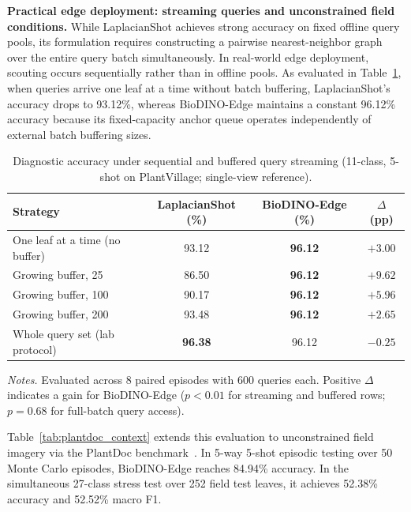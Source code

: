 \textbf{Practical edge deployment: streaming queries and unconstrained field conditions.} While LaplacianShot achieves strong accuracy on fixed offline query pools, its formulation requires constructing a pairwise nearest-neighbor graph over the entire query batch simultaneously. In real-world edge deployment, scouting occurs sequentially rather than in offline pools. As evaluated in Table~\ref{tab:batchsize}, when queries arrive one leaf at a time without batch buffering, LaplacianShot's accuracy drops to 93.12\%, whereas BioDINO-Edge maintains a constant 96.12\% accuracy because its fixed-capacity anchor queue operates independently of external batch buffering sizes.

\begin{table}[htbp]
\caption{Diagnostic accuracy under sequential and buffered query streaming (11-class, 5-shot on PlantVillage; single-view reference).}
\label{tab:batchsize}
\centering

\footnotesize
\setlength{\tabcolsep}{4pt}
\begin{tabular*}{\columnwidth}{@{\extracolsep{\fill}}lccc}
\toprule
\textbf{Strategy} & \textbf{LaplacianShot (\%)} & \textbf{BioDINO-Edge (\%)} & \textbf{$\Delta$ (pp)} \\
\midrule
One leaf at a time (no buffer) & 93.12 & \textbf{96.12} & $+3.00$ \\
Growing buffer, 25 & 86.50 & \textbf{96.12} & $+9.62$ \\
Growing buffer, 100 & 90.17 & \textbf{96.12} & $+5.96$ \\
Growing buffer, 200 & 93.48 & \textbf{96.12} & $+2.65$ \\
Whole query set (lab protocol) & \textbf{96.38} & 96.12 & $-0.25$ \\
\bottomrule
\end{tabular*}

\vspace{3pt}
\begin{minipage}{\columnwidth}
\footnotesize
\textit{Notes.} Evaluated across 8 paired episodes with 600 queries each. Positive $\Delta$ indicates a gain for BioDINO-Edge ($p < 0.01$ for streaming and buffered rows; $p = 0.68$ for full-batch query access).
\end{minipage}
\end{table}

Table~\ref{tab:plantdoc_context} extends this evaluation to unconstrained field imagery via the PlantDoc benchmark~\cite{singh2020plantdoc}. In 5-way 5-shot episodic testing over 50 Monte Carlo episodes, BioDINO-Edge reaches 84.94\% accuracy. In the simultaneous 27-class stress test over 252 field test leaves, it achieves 52.38\% accuracy and 52.52\% macro F1.

